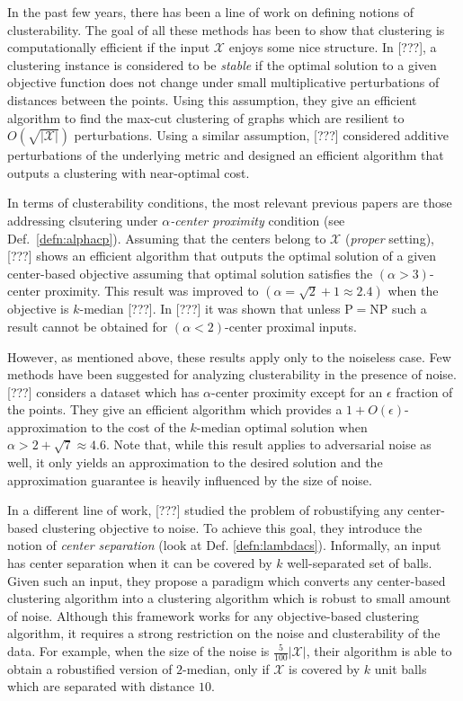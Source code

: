 \documentclass[11pt]{article}
\newcommand{\mc}{\mathcal}
\begin{document}
In the past few years, there has been a line of work on defining notions of clusterability. The goal of all these methods has been to show that clustering is computationally efficient if the input $\mc X$ enjoys some nice structure. In {\color{red} [???]\cite{bilu2012stable}}, a clustering instance is considered to be \emph{stable} if the optimal solution to a given objective function does not change under small multiplicative perturbations of distances between the points. Using this assumption, they give an efficient algorithm to find the max-cut clustering of graphs which are resilient to $O(\sqrt{|\mc X|})$ perturbations. Using a similar assumption, {\color{red} [???]\cite{ackerman2009clusterability}} considered additive perturbations of the underlying metric and designed an efficient algorithm that outputs a clustering with near-optimal cost. 

In terms of clusterability conditions, the most relevant previous papers are those addressing clsutering under {\em $\alpha$-center proximity} condition (see Def.~\ref{defn:alphacp}).
Assuming that the centers belong to $\mc X$ ({\em proper} setting),  {\color{red} [???]\cite{awasthi2012center}} shows an efficient algorithm that outputs the optimal solution of a given center-based objective assuming that optimal solution satisfies the $(\alpha > 3)$-center proximity. This result was improved to $(\alpha = \sqrt{2} + 1 \approx 2.4)$ when the objective is $k$-median {\color{red} [???]\cite{balcan2012clustering}}. In {\color{red} [???]\cite{ben2014data}} it was shown that unless P$=$NP such a result cannot be obtained for $(\alpha <2)$-center proximal inputs.

However, as mentioned above, these results apply only to the noiseless case.
Few methods have been suggested for analyzing clusterability in the presence of noise. 
{\color{red} [???]\cite{balcan2012clustering}} considers a dataset which has $\alpha$-center proximity except for an $\epsilon$ fraction of the points. They give an efficient algorithm which provides a $1+O(\epsilon)$-approximation to the cost of the $k$-median optimal solution when $\alpha > 2+\sqrt{7} \approx 4.6$. Note that, while this result applies to adversarial noise as well, it only yields an approximation to the desired solution and  the approximation guarantee is heavily influenced by the size of noise. 

In a different line of work, {\color{red} [???]\cite{ben2014clustering}} studied the problem of robustifying any center-based clustering objective to noise. To achieve this goal, they introduce the notion of {\em center separation} (look at Def. \ref{defn:lambdacs}). Informally, an input has center separation when it can be covered by $k$ well-separated set of balls.
Given such an input, they propose a paradigm which converts any center-based clustering algorithm into a clustering algorithm which is robust to small amount of noise.
Although this framework works for any objective-based clustering algorithm, it requires a strong restriction on the noise and clusterability of the data. For example, when the size of the noise is $\frac{5}{100}|\mc X|$, their algorithm is able to obtain a robustified version of $2$-median, only if $\mc X$ is covered by $k$ unit balls which are separated with distance $10$. 
\end{document}
